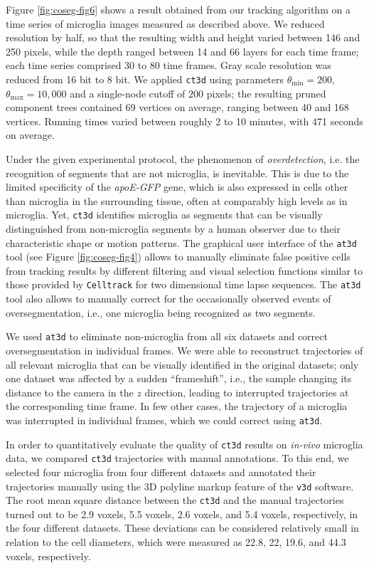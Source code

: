 Figure \ref{fig:coseg-fig6} shows a result obtained from
our tracking algorithm on a time series of microglia images measured
as described above. We reduced resolution by half, so that the
resulting width and height varied between 146 and 250 pixels, while
the depth ranged between 14 and 66 layers for each time frame; each
time series comprised 30 to 80 time frames. Gray scale resolution was
reduced from 16 bit to 8 bit. We applied \texttt{ct3d} using
parameters $\theta_{\min}=200$, $\theta_{\max}=10,000$ and a
single-node cutoff of $200$ pixels; the resulting pruned component
trees contained 69 vertices on average, ranging between 40 and 168
vertices. Running times varied between roughly 2 to 10 minutes, with
471 seconds on average. 

Under the given experimental protocol, the phenomenon of
\emph{overdetection}, i.e. the recognition of segments that are not
microglia, is inevitable. This is due to the limited specificity of
the \emph{apoE-GFP} gene, which is also expressed in cells other than
microglia in the surrounding tissue, often at comparably high levels
as in microglia. Yet, \texttt{ct3d} identifies microglia as segments
that can be visually distinguished from non-microglia segments by a
human observer due to their characteristic shape or motion
patterns. The graphical user interface of the \texttt{at3d} tool (see
Figure \ref{fig:coseg-fig4}) allows to manually eliminate false positive
cells from tracking results by different filtering and visual
selection functions similar to those provided by \texttt{Celltrack}
for two dimensional time lapse sequences. The \texttt{at3d} tool also
allows to manually correct for the occasionally observed events of
oversegmentation, i.e., one microglia being recognized as two segments.

We used \texttt{at3d} to eliminate non-microglia from all six datasets
and correct oversegmentation in individual frames. We were able to
reconstruct trajectories of all relevant microglia that can be
visually identified in the original datasets; only one dataset was
affected by a sudden ``frameshift'', i.e., the sample changing its
distance to the camera in the $z$ direction, leading to interrupted
trajectories at the corresponding time frame. In few other cases, the
trajectory of a microglia was interrupted in individual frames, which
we could correct using \texttt{at3d}.

In order to quantitatively evaluate the quality of \texttt{ct3d}
results on \textit{in-vivo} microglia data, we compared \texttt{ct3d}
trajectories with manual annotations. To this end, we selected four
microglia from four different datasets and annotated their
trajectories manually using the 3D polyline markup feature of the
\texttt{v3d} software. The root mean square distance between the
\texttt{ct3d} and the manual trajectories turned out to be 2.9 voxels,
5.5 voxels, 2.6 voxels, and 5.4 voxels, respectively, in the four
different datasets. These deviations can be considered relatively
small in relation to the cell diameters, which were measured as 22.8,
22, 19.6, and 44.3 voxels, respectively.

